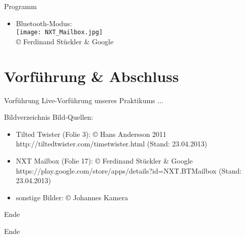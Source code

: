 \documentclass{beamer}
\begin{document}
\begin{frame}{Programm}
\begin{itemize}
	\item Bluetooth-Modus: \\
	\vspace{.5em}
	\texttt{[image: NXT\_Mailbox.jpg]}\\
	{\tiny\copyright \hspace{.3em} Ferdinand Stückler \& Google}
\end{itemize}
\end{frame}

\section{Vorführung \& Abschluss}
\begin{frame}{Vorführung}
	Live-Vorführung unseres Praktikums ...
\end{frame}
\begin{frame}{Bildverzeichnis}
Bild-Quellen:
\begin{itemize}
	\item Tilted Twister (Folie 3): \copyright \hspace{.3em} Hans Andersson 2011\\
		{\tiny http://tiltedtwister.com/timetwister.html (Stand: 23.04.2013)}
	\item NXT Mailbox (Folie 17): \copyright \hspace{.3em} Ferdinand Stückler \& Google\\
		{\tiny https://play.google.com/store/apps/details?id=NXT.BTMailbox (Stand: 23.04.2013)}
	\item sonstige Bilder: \copyright \hspace{.3em} Johannes Kamera
\end{itemize}
\end{frame}
\begin{frame}{Ende}
	\begin{center}\huge Ende\end{center}
\end{frame}





\end{document}
